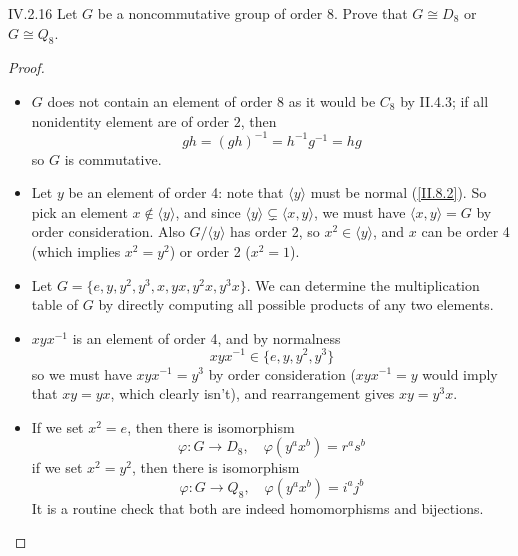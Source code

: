 \begin{problem}{IV.2.16}
Let $G$ be a noncommutative group of order 8. Prove that $G \cong D_8$ or $G \cong Q_8$.
\end{problem}
\begin{proof} \
\begin{itemize}
	\setlength\itemsep{0pt}
	\item $G$ does not contain an element of order $8$ as it would be $C_8$ by II.4.3; if all nonidentity element are of order $2$, then 
	\[
	gh = {(gh)}^{-1} = h^{-1}g^{-1} = hg
	\]
	so $G$ is commutative.
	\item Let $y$ be an element of order 4: note that $\langle y \rangle$ must be normal (\ref{II.8.2}). So pick an element $x \notin \langle y \rangle$, and since $\langle y \rangle \subsetneq \langle x,y \rangle$, we must have $\langle x,y \rangle = G$ by order consideration. Also $G/\langle y \rangle$ has order 2, so $x^2 \in \langle y \rangle$, and $x$ can be order 4 (which implies $x^2 = y^2$) or order 2 ($x^2 = 1$).
	\item Let $G = \{e,y,y^2,y^3,x,yx,y^2x,y^3x\}$. We can determine the multiplication table of $G$ by directly computing all possible products of any two elements.
	\item $xyx^{-1}$ is an element of order 4, and by normalness
	\[
	xyx^{-1} \in \{e,y,y^2,y^3\}
	\]
	so we must have $xyx^{-1} = y^3$ by order consideration ($xyx^{-1} = y$ would imply that $xy = yx$, which clearly isn't), and rearrangement gives $xy = y^3x$.
	\item If we set $x^2 = e$, then there is isomorphism
	\[
	\varphi: G \to D_8, \quad \varphi(y^ax^b) = r^as^b	
	\]
	if we set $x^2 = y^2$, then there is isomorphism
	\[
	\varphi: G \to Q_8, \quad \varphi(y^ax^b) = i^aj^b
	\]
	It is a routine check that both are indeed homomorphisms and bijections.
\end{itemize}
\end{proof}

